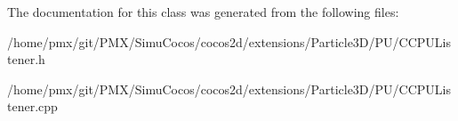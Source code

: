 The documentation for this class was generated from the following files\+:\begin{DoxyCompactItemize}
\item 
/home/pmx/git/\+P\+M\+X/\+Simu\+Cocos/cocos2d/extensions/\+Particle3\+D/\+P\+U/C\+C\+P\+U\+Listener.\+h\item 
/home/pmx/git/\+P\+M\+X/\+Simu\+Cocos/cocos2d/extensions/\+Particle3\+D/\+P\+U/C\+C\+P\+U\+Listener.\+cpp\end{DoxyCompactItemize}
